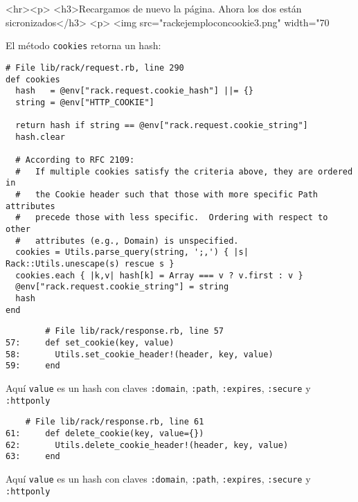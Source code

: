 \begin{rawhtml}
<hr><p>
<h3>Recargamos de nuevo la página. 
Ahora los dos están sicronizados</h3>
<p>
<img src="rackejemploconcookie3.png" width="70%
\end{rawhtml}

El método \verb|cookies|
retorna un hash:
\begin{verbatim}
# File lib/rack/request.rb, line 290
def cookies
  hash   = @env["rack.request.cookie_hash"] ||= {}
  string = @env["HTTP_COOKIE"]

  return hash if string == @env["rack.request.cookie_string"]
  hash.clear

  # According to RFC 2109:
  #   If multiple cookies satisfy the criteria above, they are ordered in
  #   the Cookie header such that those with more specific Path attributes
  #   precede those with less specific.  Ordering with respect to other
  #   attributes (e.g., Domain) is unspecified.
  cookies = Utils.parse_query(string, ';,') { |s| Rack::Utils.unescape(s) rescue s }
  cookies.each { |k,v| hash[k] = Array === v ? v.first : v }
  @env["rack.request.cookie_string"] = string
  hash
end
\end{verbatim}


\begin{verbatim}
        # File lib/rack/response.rb, line 57
57:     def set_cookie(key, value)
58:       Utils.set_cookie_header!(header, key, value)
59:     end
\end{verbatim}

Aquí \verb|value| es un hash con claves \verb|:domain|,
\verb|:path|, \verb|:expires|,
\verb|:secure| y
\verb|:httponly|


\begin{verbatim}
    # File lib/rack/response.rb, line 61
61:     def delete_cookie(key, value={})
62:       Utils.delete_cookie_header!(header, key, value)
63:     end
\end{verbatim}
Aquí \verb|value| es un hash con claves \verb|:domain|,
\verb|:path|, \verb|:expires|,
\verb|:secure| y
\verb|:httponly|


